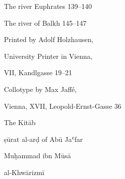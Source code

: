 \documentclass[11pt]{article}
\begin{document}
\begin{center}The river Euphrates 139–140\end{center}

\par{}\par

\begin{center}The river of Balkh 145–147\end{center}

\par{}\par

\clearpage

\begin{center}\large Printed by Adolf Holzhausen,\end{center}

\begin{center}\large University Printer in Vienna,\end{center}

\begin{center}\large VII, Kandlgasse 19–21\end{center}

\begin{center}\large Collotype by Max Jaffé,\end{center}

\begin{center}\large Vienna, XVII, Leopold-Ernst-Gasse 36\end{center}

\clearpage

\begin{center}\large The Kitāb\end{center}

\begin{center}\large ṣūrat al-arḍ of Abū Jaʿfar\end{center}

\begin{center}\large Muḥammad ibn Mūsā\end{center}

\begin{center}\large al-Khwārizmī\end{center}
\end{document}
